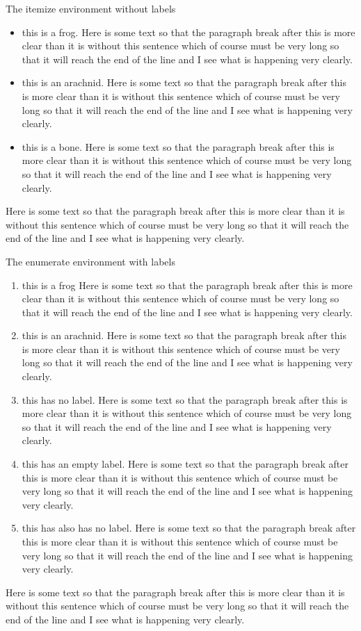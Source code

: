 ﻿\documentclass{article}
\begin{document}
The itemize environment without labels
\begin{itemize}
\item this is a frog. Here is some text so that the paragraph break after this
is more clear than it is without this sentence which of
course must be very long so that it will reach the end of
the line and I see what is happening very clearly.
\item this is an arachnid. Here is some text so that the paragraph break after this
is more clear than it is without this sentence which of
course must be very long so that it will reach the end of
the line and I see what is happening very clearly.
\item this is a bone. Here is some text so that the paragraph break after this
is more clear than it is without this sentence which of
course must be very long so that it will reach the end of
the line and I see what is happening very clearly.
\end{itemize}
Here is some text so that the paragraph break after this
is more clear than it is without this sentence which of
course must be very long so that it will reach the end of
the line and I see what is happening very clearly.


The enumerate environment with labels
\begin{enumerate}
\item[frog~~~] this is a frog Here is some text so that the paragraph break after this
is more clear than it is without this sentence which of
course must be very long so that it will reach the end of
the line and I see what is happening very clearly.
\item[spider~~~] this is an arachnid. Here is some text so that the paragraph break after this
is more clear than it is without this sentence which of
course must be very long so that it will reach the end of
the line and I see what is happening very clearly.
\item this has no label. Here is some text so that the paragraph break after this
is more clear than it is without this sentence which of
course must be very long so that it will reach the end of
the line and I see what is happening very clearly.
\item[] this has an empty label. Here is some text so that the paragraph break after this
is more clear than it is without this sentence which of
course must be very long so that it will reach the end of
the line and I see what is happening very clearly.
\item this has also has no label. Here is some text so that the paragraph break after this
is more clear than it is without this sentence which of
course must be very long so that it will reach the end of
the line and I see what is happening very clearly.
\end{enumerate}
Here is some text so that the paragraph break after this
is more clear than it is without this sentence which of
course must be very long so that it will reach the end of
the line and I see what is happening very clearly.
\end{document}
